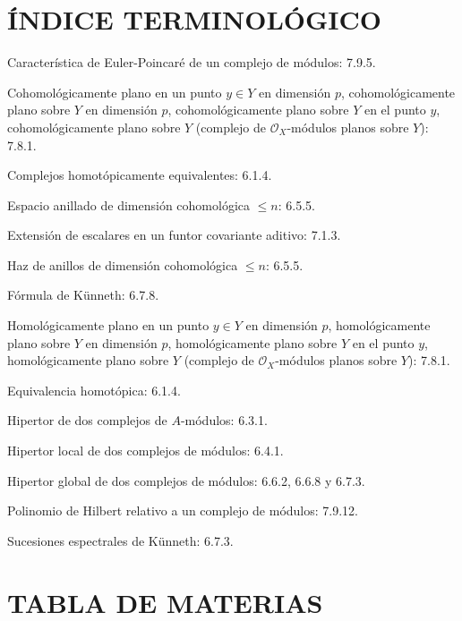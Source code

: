 \documentclass[10pt,oneside,openany]{book}
\theoremstyle{egaenv}\newtheorem*{env}{---}
\theoremstyle{egastatement}
\theoremstyle{egadescription}
\newcommand{\oldpage}[2][]{\marginnote{\normalfont\scriptsize\textbf{#1}\,|\,#2}\ignorespaces}
\renewcommand{\leq}{\leqslant}
\begin{document}
\clearpage
\oldpage[III]{214}
\section*{ÍNDICE TERMINOLÓGICO}

\begin{flushleft}
Característica de Euler-Poincaré de un complejo de módulos: 7.9.5.

\medskip
Cohomológicamente plano en un punto $y\in Y$ en dimensión $p$,
cohomológicamente plano sobre $Y$ en dimensión $p$, cohomológicamente plano
sobre $Y$ en el punto $y$, cohomológicamente plano sobre $Y$ (complejo de
$\mathscr O_X$-módulos planos sobre $Y$): 7.8.1.

\medskip
Complejos homotópicamente equivalentes: 6.1.4.

\medskip
Espacio anillado de dimensión cohomológica $\leq n$: 6.5.5.

\medskip
Extensión de escalares en un funtor covariante aditivo: 7.1.3.

\medskip
Haz de anillos de dimensión cohomológica $\leq n$: 6.5.5.

\medskip
Fórmula de Künneth: 6.7.8.

\medskip
Homológicamente plano en un punto $y\in Y$ en dimensión $p$,
homológicamente plano sobre $Y$ en dimensión $p$, homológicamente plano sobre
$Y$ en el punto $y$, homológicamente plano sobre $Y$ (complejo de
$\mathscr O_X$-módulos planos sobre $Y$): 7.8.1.

\medskip
Equivalencia homotópica: 6.1.4.

\medskip
Hipertor de dos complejos de $A$-módulos: 6.3.1.

\medskip
Hipertor local de dos complejos de módulos: 6.4.1.

\medskip
Hipertor global de dos complejos de módulos: 6.6.2, 6.6.8 y 6.7.3.

\medskip
Polinomio de Hilbert relativo a un complejo de módulos: 7.9.12.

\medskip
Sucesiones espectrales de Künneth: 6.7.3.
\end{flushleft}

\clearpage
\oldpage[III]{215}
\section*{TABLA DE MATERIAS}
\end{document}
